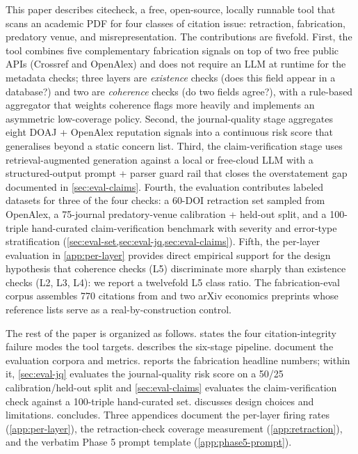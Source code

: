 \documentclass[12pt]{article}
\begin{document}
This paper describes citecheck, a free, open-source, locally runnable tool that scans an academic PDF for four classes of citation issue: retraction, fabrication, predatory venue, and misrepresentation. The contributions are fivefold. First, the tool combines five complementary fabrication signals on top of two free public APIs (Crossref and OpenAlex) and does not require an LLM at runtime for the metadata checks; three layers are \emph{existence} checks (does this field appear in a database?) and two are \emph{coherence} checks (do two fields agree?), with a rule-based aggregator that weights coherence flags more heavily and implements an asymmetric low-coverage policy. Second, the journal-quality stage aggregates eight DOAJ + OpenAlex reputation signals into a continuous risk score that generalises beyond a static concern list. Third, the claim-verification stage uses retrieval-augmented generation against a local or free-cloud LLM with a structured-output prompt + parser guard rail that closes the overstatement gap documented in \cref{sec:eval-claims}. Fourth, the evaluation contributes labeled datasets for three of the four checks: a 60-DOI retraction set sampled from OpenAlex, a 75-journal predatory-venue calibration + held-out split, and a 100-triple hand-curated claim-verification benchmark with severity and error-type stratification (\cref{sec:eval-set,sec:eval-jq,sec:eval-claims}). Fifth, the per-layer evaluation in \cref{app:per-layer} provides direct empirical support for the design hypothesis that coherence checks (L5) discriminate more sharply than existence checks (L2, L3, L4): we report a twelvefold L5 class ratio. The fabrication-eval corpus assembles 770 citations from \citet{walters_wilder_2023} and two arXiv economics preprints whose reference lists serve as a real-by-construction control.

The rest of the paper is organized as follows.  states the four citation-integrity failure modes the tool targets.  describes the six-stage pipeline.  document the evaluation corpora and metrics.  reports the fabrication headline numbers; within it, \cref{sec:eval-jq} evaluates the journal-quality risk score on a 50/25 calibration/held-out split and \cref{sec:eval-claims} evaluates the claim-verification check against a 100-triple hand-curated set.  discusses design choices and limitations.  concludes. Three appendices document the per-layer firing rates (\cref{app:per-layer}), the retraction-check coverage measurement (\cref{app:retraction}), and the verbatim Phase 5 prompt template (\cref{app:phase5-prompt}).
\end{document}
